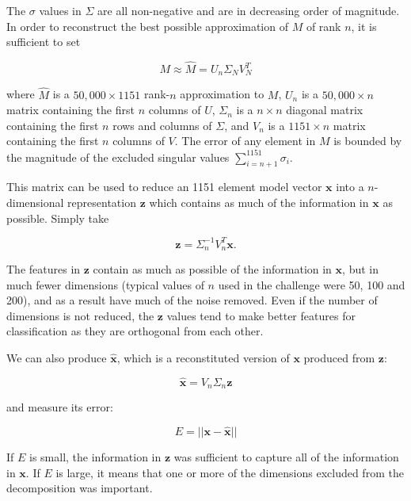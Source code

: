 \documentclass{article}
\begin{document}
The $\sigma$ values in $\Sigma$ are all non-negative and are in decreasing order of magnitude.  In order to reconstruct the best possible approximation of $M$ of rank $n$, it is sufficient to set

\begin{equation}
M \approx \hat{M} = U_n \Sigma_N V_N^T
\end{equation}

where $\hat{M}$ is a $50,000 \times 1151$ rank-$n$ approximation to $M$, $U_n$ is a $50,000 \times n$ matrix containing the first $n$ columns of $U$, $\Sigma_n$ is a $n \times n$ diagonal matrix containing the first $n$ rows and columns of $\Sigma$, and $V_n$ is a $1151 \times n$ matrix containing the first $n$ columns of $V$.  The error of any element in $M$ is bounded by the magnitude of the excluded singular values $\sum_{i=n+1}^{1151} \sigma_i$.

This matrix can be used to reduce an 1151 element model vector $\mathbf{x}$ into a $n$-dimensional representation $\mathbf{z}$ which contains as much of the information in $\mathbf{x}$ as possible.  Simply take

\begin{equation}
\label{eqn:svd-encode}
\mathbf{z} = \Sigma_n^{-1} V_n^T \mathbf{x} .
\end{equation}

The features in $\mathbf{z}$ contain as much as possible of the information in $\mathbf{x}$, but in much fewer dimensions (typical values of $n$ used in the challenge were 50, 100 and 200), and as a result have much of the noise removed.  Even if the number of dimensions is not reduced, the $\mathbf{z}$ values tend to make better features for classification as they are orthogonal from each other.

We can also produce $\hat{\mathbf{x}}$, which is a reconstituted version of $\mathbf{x}$ produced from $\mathbf{z}$:

\begin{equation}
\hat{\mathbf{x}} = V_n \Sigma_n \mathbf{z}
\end{equation}

and measure its error:

\begin{equation}
\label{eqn:decomp-error}
E = || \mathbf{x - \hat{x}} ||
\end{equation}

If $E$ is small, the information in $\mathbf{z}$ was sufficient to capture all of the information in $\mathbf{x}$.  If $E$ is large, it means that one or more of the dimensions excluded from the decomposition was important.
\end{document}
